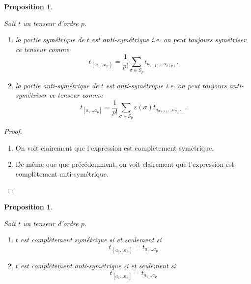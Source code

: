 \documentclass[a4paper,11pt]{report}
\theoremstyle{definition}
\theoremstyle{plain}
\newtheorem{prop}[thm]{Proposition}
\theoremstyle{definition}
\theoremstyle{remark}
\begin{document}
                \begin{prop}\begin{leftbar}
                    Soit $t$ un tenseur d'ordre $p$.
                    \begin{enumerate}[label = \textit{\roman*)}]
                        \item la partie symétrique de $t$ est anti-symétrique i.e. on peut toujours symétriser ce tenseur comme
                        \begin{equation}
                            t_{(a_1\dots a_p)} = \frac{1}{p!} \sum_{\sigma\in S_p} t_{a_{\sigma(1)}\dots a_{\sigma(p)}}.
                        \end{equation}
                        \item la partie anti-symétrique de $t$ est anti-symétrique i.e. on peut toujours anti-symétriser ce tenseur comme
                        \begin{equation}
                            t_{[a_1\dots a_p]} = \frac{1}{p!} \sum_{\sigma\in S_p}\varepsilon(\sigma) t_{a_{\sigma(1)}\dots a_{\sigma(p)}}.
                        \end{equation}
                    \end{enumerate}
                \end{leftbar}\end{prop}
                
                \begin{proof}${}$
                    \begin{enumerate}[label = \textit{\roman*)}]
                        \item On voit clairement que l'expression est complètement symétrique.
                        \item De même que que précédemment, on voit clairement que l'expression est complètement anti-symétrique.
                    \end{enumerate}
                \end{proof}
                
                \begin{prop}\begin{leftbar}
                    Soit $t$ un tenseur d'ordre $p$.
                    \begin{enumerate}[label = \textit{\roman*)}]
                        \item $t$ est complètement symétrique si et seulement si
                        \begin{equation}
                            t_{(a_1\dots a_p)} = t_{a_1\dots a_p}
                        \end{equation}
                        \item $t$ est complètement anti-symétrique si et seulement si
                        \begin{equation}
                            t_{[a_1\dots a_p]} = t_{a_1\dots a_p}
                        \end{equation}
                    \end{enumerate}
                \end{leftbar}\end{prop}
                
\end{document}
